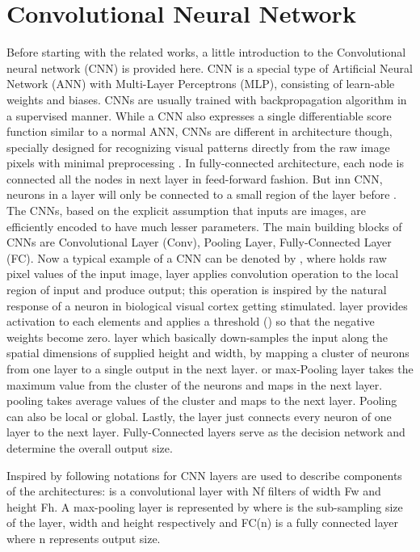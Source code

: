 \section{Convolutional Neural Network}
Before starting with the related works, a little introduction to the Convolutional neural network (CNN) is provided here. CNN \cite{wikicnn} is a special type of Artificial Neural Network (ANN) with Multi-Layer Perceptrons (MLP),
consisting of learn-able weights and biases. CNNs are usually trained with backpropagation algorithm in a 
supervised manner. While a CNN also expresses a single differentiable score function similar to a normal ANN, CNNs are different in architecture though, specially designed for recognizing visual patterns directly from the raw image pixels with minimal preprocessing \cite{lecun2015lenet}.
In fully-connected architecture, each node is connected all the nodes in next layer in feed-forward fashion. But inn CNN, neurons in a layer will only be connected to a small region of the layer before \cite{cs231n}.
The CNNs, based on the explicit assumption that inputs are images, are efficiently encoded to have much lesser parameters. The main building blocks of CNNs are Convolutional Layer (Conv), 
Pooling Layer, Fully-Connected Layer (FC). Now a typical example of a CNN can be denoted by , where  holds raw pixel values of the input image,  layer applies 
convolution operation to the local region of input and produce output; this operation is inspired by the natural response of a neuron in biological visual cortex getting stimulated.  layer provides activation to each elements 
and applies a threshold () so that the negative weights become zero.  layer which basically down-samples the input along the spatial dimensions of supplied height and width, by mapping a cluster of neurons
from one layer to a single output in the next layer.  or max-Pooling layer takes the maximum value from the cluster of the neurons and maps in the next layer.  pooling takes average values of the cluster and maps to the next layer. Pooling can also be local or global. Lastly, the  layer just connects every neuron of one layer to the next layer. Fully-Connected layers serve as the decision network and determine the overall output size.

Inspired by \cite{stateoftheart} following notations for CNN layers are used to describe components of the architectures:  is a convolutional layer with Nf filters of width Fw and height Fh.
A max-pooling layer is represented by  where  is the sub-sampling size of the layer, width and height respectively and FC(n) is a fully connected layer where n represents output size.\\

